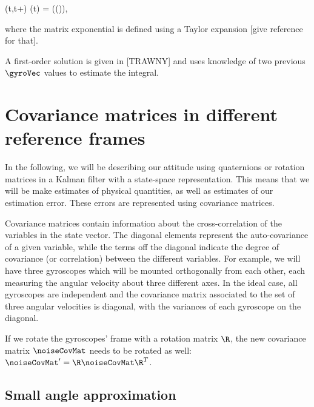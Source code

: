 \begin{equations}
\thetaMat(t,t+\Deltat) \equiv \thetaMat(\Delta t) = \exp\left(\matOmega(\gyroVec)\Deltat\right),
\label{eq:quaternionIntegration}
\end{equations}
where the matrix exponential is defined using a Taylor expansion [give reference for that]. 


A first-order solution is given in [TRAWNY] and uses knowledge of two previous $\gyroVec$ values to estimate the integral.

\section{Covariance matrices in different reference frames}
In the following, we will be describing our attitude using quaternions or rotation matrices in a Kalman filter with a state-space representation. This means that we will be make estimates of physical quantities, as well as estimates of our estimation error. These errors are represented using covariance matrices. 

Covariance matrices contain information about the cross-correlation of the variables in the state vector. The diagonal elements represent the auto-covariance of a given variable, while the terms off the diagonal indicate the degree of covariance (or correlation) between the different variables. For example, we will have three gyroscopes which will be mounted orthogonally from each other, each measuring the angular velocity about three different axes. In the ideal case, all gyroscopes are independent and the covariance matrix associated to the set of three angular velocities is diagonal, with the variances of each gyroscope on the diagonal.

If we rotate the gyroscopes' frame with a rotation matrix $\R$, the new covariance matrix $\noiseCovMat$ needs to be rotated as well: $\noiseCovMat' = \R\noiseCovMat\R^T$. 

\subsection{Small angle approximation}

